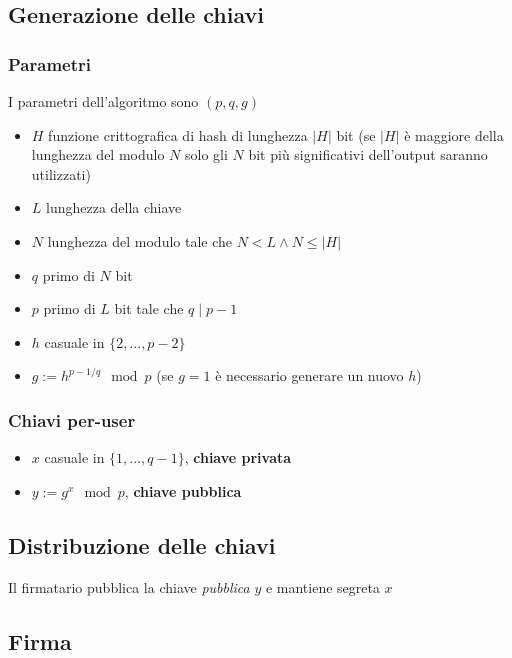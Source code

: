 \documentclass[14pt]{extarticle}
\begin{document}
    \subsection{Generazione delle chiavi}

    \subsubsection{Parametri}

    I parametri dell'algoritmo sono $(p, q, g)$

    \begin{itemize}
        \item $H$ funzione crittografica di hash di lunghezza $|H|$ bit (se $|H|$ è maggiore della lunghezza del modulo $N$ solo gli $N$ bit più significativi dell'output saranno utilizzati)
        \item $L$ lunghezza della chiave
        \item $N$ lunghezza del modulo tale che $N < L \wedge N \leq  |H| $
        \item $q$ primo di $N$ bit
        \item $p$ primo di $L$ bit tale che $q \mid p-1$
        \item $h$ casuale in $\{2, ..., p-2\}$
        \item $g := h^{{p-1}/q} \mod p$ (se $g=1$ è necessario generare un nuovo $h$)
    \end{itemize}

    \subsubsection{Chiavi per-user}

    \begin{itemize}
        \item $x$ casuale in $\{1, ..., q-1\}$, \textbf{chiave privata}
        \item $y := g^x \mod p$, \textbf{chiave pubblica}
    \end{itemize}

    \subsection{Distribuzione delle chiavi}

    Il firmatario pubblica la chiave \emph{pubblica} $y$ e mantiene segreta $x$

    \subsection{Firma}
\end{document}
